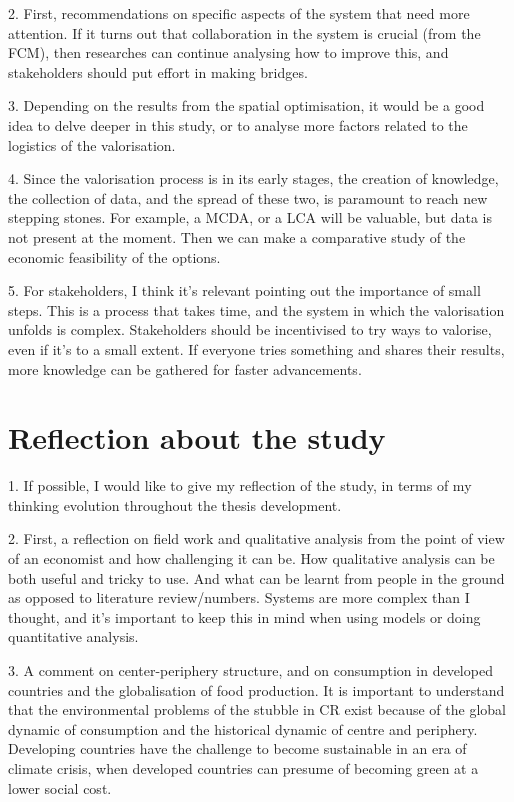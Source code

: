 2. First, recommendations on specific aspects of the system that need more attention. If it turns out that collaboration in the system is crucial (from the FCM), then researches can continue analysing how to improve this, and stakeholders should put effort in making bridges. 

3. Depending on the results from the spatial optimisation, it would be a good idea to delve deeper in this study, or to analyse more factors related to the logistics of the valorisation. 

4. Since the valorisation process is in its early stages, the creation of knowledge, the collection of data, and the spread of these two, is paramount to reach new stepping stones. For example, a MCDA, or a LCA will be valuable, but data is not present at the moment. Then we can make a comparative study of the economic feasibility of the options.

5. For stakeholders, I think it's relevant pointing out the importance of small steps. This is a process that takes time, and the system in which the valorisation unfolds is complex. Stakeholders should be incentivised to try ways to valorise, even if it's to a small extent. If everyone tries something and shares their results, more knowledge can be gathered for faster advancements.

\section{Reflection about the study}

1. If possible, I would like to give my reflection of the study, in terms of my thinking evolution throughout the thesis development.

2. First, a reflection on field work and qualitative analysis from the point of view of an economist and how challenging it can be. How qualitative analysis can be both useful and tricky to use. And what can be learnt from people in the ground as opposed to literature review/numbers. Systems are more complex than I thought, and it's important to keep this in mind when using models or doing quantitative analysis.

3. A comment on center-periphery structure, and on consumption in developed countries and the globalisation of food production. It is important to understand that the environmental problems of the stubble in CR exist because of the global dynamic of consumption and the historical dynamic of centre and periphery. Developing countries have the challenge to become sustainable in an era of climate crisis, when developed countries can presume of becoming green at a lower social cost.


